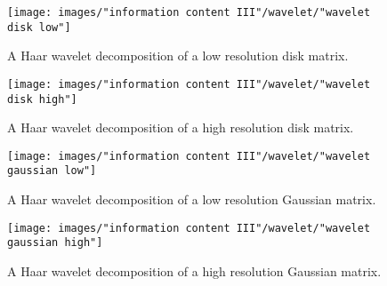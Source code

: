 \begin{figure}[htbp] %
   \centering
   \texttt{[image: images/"information content III"/wavelet/"wavelet disk low"]} 
   \caption{A Haar wavelet decomposition of a low resolution disk matrix.}
   \label{fig:wavelets:disk low}
\end{figure}
%
\begin{figure}[htbp] %
   \centering
   \texttt{[image: images/"information content III"/wavelet/"wavelet disk high"]} 
   \caption{A Haar wavelet decomposition of a high resolution disk matrix.}
   \label{fig:wavelets:disk high}
\end{figure}

\begin{figure}[htbp] %
   \centering
   \texttt{[image: images/"information content III"/wavelet/"wavelet gaussian low"]} 
   \caption{A Haar wavelet decomposition of a low resolution Gaussian matrix.}
   \label{fig:wavelets:gaussian low}
\end{figure}
%
\begin{figure}[htbp] %
   \centering
   \texttt{[image: images/"information content III"/wavelet/"wavelet gaussian high"]} 
   \caption{A Haar wavelet decomposition of a high resolution Gaussian matrix.}
   \label{fig:wavelets:gaussian high}
\end{figure}



\endinput